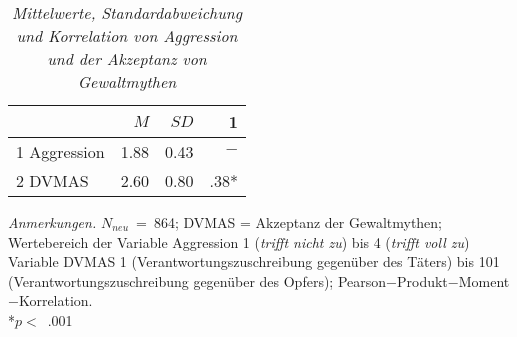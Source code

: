 \begin{table}[htb]
    \caption[Mittelwerte, Standardabweichung und Korrelation von Aggression und der Akzeptanz von Gewaltmythen]{\textit {Mittelwerte, Standardabweichung und Korrelation von Aggression und der Akzeptanz von Gewaltmythen}} 
    \label{H2_Pearson}
    \centering
    \begin{adjustbox}{width=5.5cm} %
    \small
    \begin{tabular}{lrrr}
      \hline
        & $M$   & $SD$ & 1 \\
      \hline
    1 Aggression      & 1.88 & 0.43  & $-$      \\
    2 DVMAS           & 2.60 & 0.80  & .38*      \\
       \hline
    \end{tabular}
    \end{adjustbox}
    
    \begin{tablenotes}
        \item \textit{Anmerkungen.} \( N_{neu} \)~=~864; DVMAS = Akzeptanz der Gewaltmythen; Wertebereich der Variable Aggression 1 (\textit{trifft nicht zu}) bis 4 (\textit{trifft voll zu}) Variable DVMAS 1 (Verantwortungszuschreibung gegenüber des Täters) bis 101 (Verantwortungszuschreibung gegenüber des Opfers); Pearson$-$Produkt$-$Moment$-$Korrelation. \\ *$p<$~.001
      \end{tablenotes}
    \end{table}

